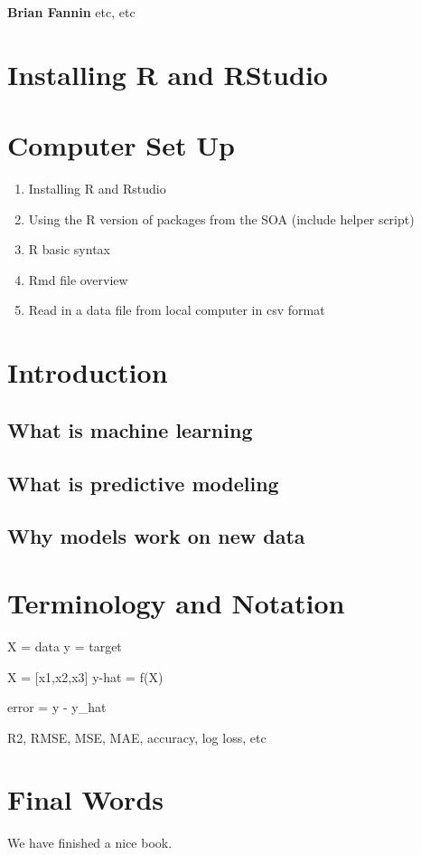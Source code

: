 \documentclass[]{book}
\providecommand{\tightlist}{%
  \setlength{\itemsep}{0pt}\setlength{\parskip}{0pt}}
\begin{document}
\textbf{Brian Fannin} etc, etc

\hypertarget{intro}{%
\chapter{Installing R and RStudio}\label{intro}}

\hypertarget{computer-set-up}{%
\chapter{Computer Set Up}\label{computer-set-up}}

\begin{enumerate}
\def\labelenumi{\arabic{enumi}.}
\tightlist
\item
  Installing R and Rstudio
\item
  Using the R version of packages from the SOA (include helper script)
\item
  R basic syntax
\item
  Rmd file overview
\item
  Read in a data file from local computer in csv format
\end{enumerate}

\hypertarget{introduction}{%
\chapter{Introduction}\label{introduction}}

\hypertarget{what-is-machine-learning}{%
\section{What is machine learning}\label{what-is-machine-learning}}

\hypertarget{what-is-predictive-modeling}{%
\section{What is predictive modeling}\label{what-is-predictive-modeling}}

\hypertarget{why-models-work-on-new-data}{%
\section{Why models work on new data}\label{why-models-work-on-new-data}}

\hypertarget{terminology-and-notation}{%
\chapter{Terminology and Notation}\label{terminology-and-notation}}

X = data
y = target

X = {[}x1,x2,x3{]}
y-hat = f(X)

error = y - y\_hat

R2, RMSE, MSE, MAE, accuracy, log loss, etc

\hypertarget{final-words}{%
\chapter{Final Words}\label{final-words}}

We have finished a nice book.


\end{document}

